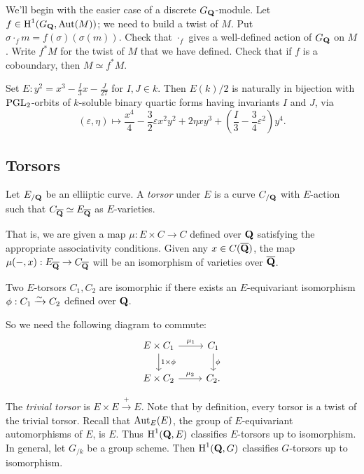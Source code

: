 We'll begin with the easier case of a discrete $G_{\mathbf{Q}}$-module. Let 
$f\in \operatorname{H}^1(G_{\mathbf{Q}},\operatorname{Aut}(M))$; we need to build a twist of $M$. 
Put $\sigma\cdot_f m = f(\sigma)(\sigma(m))$. Check that $\cdot_f$ gives 
a well-defined action of $G_{\mathbf{Q}}$ on $M$. Write $f^\ast M$ for the twist of $M$ 
that we have defined. Check that if $f$ is a coboundary, then 
$M\simeq f^\ast M$. 

\begin{theorem}
Set $E:y^2=x^3-\frac{I}{3} x-\frac{J}{27}$ for $I,J\in k$. Then 
$E(k)/2$ is naturally in bijection with $\operatorname{PGL}_2$-orbits of $k$-soluble 
binary quartic forms having invariants $I$ and $J$, via 
\[
  (\varepsilon,\eta)\mapsto \frac{x^4}{4}-\frac 3 2 \varepsilon x^2 y^2 + 2\eta x y^3 + \left(\frac I 3-\frac 3 4 \varepsilon^2\right) y^4 .
\]
\end{theorem}





\subsection{Torsors}

\begin{definition}
Let $E_{/\mathbf{Q}}$ be an elliiptic curve. A \emph{torsor} under $E$ is a curve 
$C_{/\mathbf{Q}}$ with $E$-action such that $C_{\overline{\mathbf{Q}}}\simeq E_{\overline{\mathbf{Q}}}$ 
as $E$-varieties. 
\end{definition}

That is, we are given a map $\mu:E\times C\to C$ defined over $\mathbf{Q}$ satisfying 
the appropriate associativity conditions. Given any $x\in C(\overline{\mathbf{Q}})$, the 
map $\mu(-,x):E_{\overline{\mathbf{Q}}}\to C_{\overline{\mathbf{Q}}}$ will be an isomorphism of 
varieties over $\overline{\mathbf{Q}}$. 

\begin{definition}
Two $E$-torsors $C_1,C_2$ are isomorphic if there exists an $E$-equivariant 
isomorphism $\phi:C_1\xrightarrow\sim C_2$ defined over $\mathbf{Q}$. 
\end{definition}

So we need the following diagram to commute:
\[\begin{tikzcd}
  E\times C_1 \ar[r, "\mu_1"] \ar[d, "1\times \phi"] 
    & C_1 \ar[d, "\phi"] \\
  E\times C_2 \ar[r, "\mu_2"] 
    & C_2 .
\end{tikzcd}\]

The \emph{trivial torsor} is $E\times E\xrightarrow+ E$. 
Note that by definition, every torsor is a twist of the trivial torsor. Recall 
that $\operatorname{Aut}_E(E)$, the group of $E$-equivariant automorphisms of $E$, 
is $E$. Thus $\operatorname{H}^1(\mathbf{Q},E)$ classifies $E$-torsors up to isomorphism. 
In general, let $G_{/k}$ be a group scheme. Then $\operatorname{H}^1(\mathbf{Q},G)$ classifies 
$G$-torsors up to isomorphism. 

